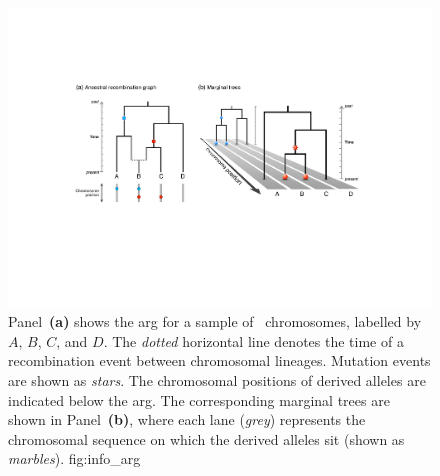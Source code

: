 

\begin{figure}[!htb]
\centering
\includegraphics[width=\textwidth]{./img/ch1/info_arg}
{Panel~\textbf{(a)} shows the \gls{arg} for a sample of ~chromosomes, labelled by $A$, $B$, $C$, and $D$.
The \emph{dotted} horizontal line denotes the time of a recombination event between chromosomal lineages.
Mutation events are shown as \emph{stars}.
The chromosomal positions of derived alleles are indicated below the \gls{arg}.
The corresponding marginal trees are shown in Panel~\textbf{(b)}, where each lane (\emph{grey}) represents the chromosomal sequence on which the derived alleles sit (shown as \emph{marbles}).}
{fig:info_arg}
\end{figure}
